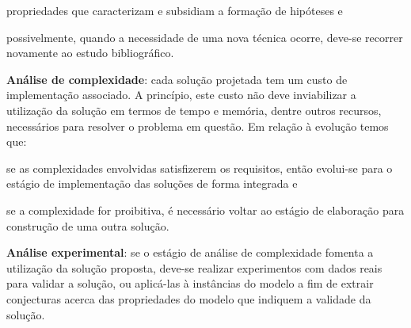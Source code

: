 \begin{compactenum}
\begin{compactenum}[(i)]
        propriedades que caracterizam e subsidiam a formação de hipóteses e
    \item possivelmente, quando a necessidade de uma nova técnica ocorre,
        deve-se recorrer novamente ao estudo bibliográfico.
    \end{compactenum}
\item {\bf Análise de complexidade}: cada solução projetada tem um custo de
    implementação associado.
    A princípio, este custo não deve inviabilizar a utilização da solução em
    termos de tempo e memória, dentre outros recursos, necessários para
    resolver o problema em questão.
    Em relação à evolução temos que:
    \begin{compactenum}[(i)]
    \item se as complexidades envolvidas satisfizerem os requisitos, então
        evolui-se para o estágio de implementação das soluções de forma
        integrada e
    \item se a complexidade for proibitiva, é necessário voltar ao estágio de
        elaboração para construção de uma outra solução.
    \end{compactenum}
\item {\bf Análise experimental}: se o estágio de análise de complexidade
    fomenta a utilização da solução proposta, deve-se realizar experimentos
    com dados reais para validar a solução, ou aplicá-las à instâncias do
    modelo a fim de extrair conjecturas acerca das propriedades do modelo que
    indiquem a validade da solução.
\end{compactenum}

